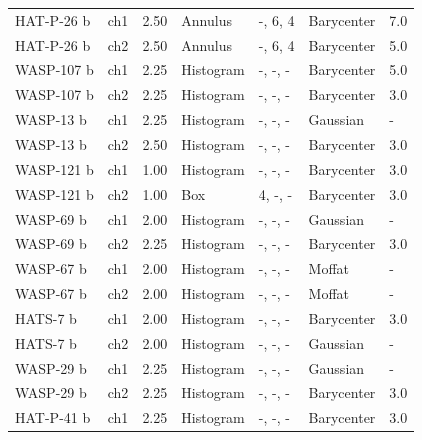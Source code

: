 \begin{subappendices}
{\begin{landscape}
\begin{longtable}{lllllll}
  HAT-P-26 b  &     ch1 &           2.50 &           Annulus &         -, 6, 4  &         Barycenter &                 7.0 \\
  HAT-P-26 b  &     ch2 &           2.50 &           Annulus &         -, 6, 4  &         Barycenter &                 5.0 \\
  WASP-107 b &     ch1 &           2.25 &         Histogram &   -, -, -  &         Barycenter &                 5.0 \\
  WASP-107 b &     ch2 &           2.25 &         Histogram &   -, -, -  &         Barycenter &                 3.0 \\
  WASP-13 b  &     ch1 &           2.25 &         Histogram &   -, -, -  &           Gaussian &                 - \\
  WASP-13 b  &     ch2 &           2.50 &         Histogram &   -, -, -  &         Barycenter &                 3.0 \\
  WASP-121 b &     ch1 &           1.00 &         Histogram &   -, -, -  &         Barycenter &                 3.0 \\
  WASP-121 b &     ch2 &           1.00 &               Box &      4, -, -  &         Barycenter &                 3.0 \\
  WASP-69 b  &     ch1 &           2.00 &         Histogram &   -, -, -  &           Gaussian &                 - \\
  WASP-69 b  &     ch2 &           2.25 &         Histogram &   -, -, -  &         Barycenter &                 3.0 \\
  WASP-67 b  &     ch1 &           2.00 &         Histogram &   -, -, -  &             Moffat &                 - \\
  WASP-67 b  &     ch2 &           2.00 &         Histogram &   -, -, -  &             Moffat &                 - \\
  HATS-7 b   &     ch1 &           2.00 &         Histogram &   -, -, -  &         Barycenter &                 3.0 \\
  HATS-7 b   &     ch2 &           2.00 &         Histogram &   -, -, -  &           Gaussian &                 - \\
  WASP-29 b  &     ch1 &           2.25 &         Histogram &   -, -, -  &           Gaussian &                 - \\
  WASP-29 b  &     ch2 &           2.25 &         Histogram &   -, -, -  &         Barycenter &                 3.0 \\
  HAT-P-41 b  &     ch1 &           2.25 &         Histogram &   -, -, -  &         Barycenter &                 3.0 \\

\end{longtable}
\end{landscape}}
\end{subappendices}
